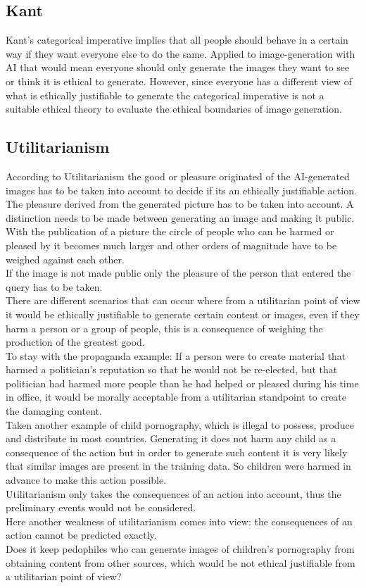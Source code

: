 \documentclass[9.5pt,twocolumn,twoside]{osajnl}
\begin{document}
\subsection{Kant}
Kant's categorical imperative implies that all people should behave in a certain way if they want everyone else to do the same.
Applied to image-generation with AI that would mean everyone should only generate the images they want to see or think it is ethical to generate.
However, since everyone has a different view of what is ethically justifiable to generate the categorical imperative is not a suitable ethical theory to evaluate the ethical boundaries of image generation.
\subsection{Utilitarianism}
According to Utilitarianism the good or pleasure originated of the AI-generated images has to be taken into account to decide if its an ethically justifiable action. \\
The pleasure derived from the generated picture has to be taken into account.
A distinction needs to be made between generating an image and making it public. With the publication of a picture the circle of people who can be harmed or pleased by it becomes much larger and other orders of magnitude have to be weighed against each other.\\
If the image is not made public only the pleasure of the person that entered the query has to be taken. \\
There are different scenarios that can occur where from a utilitarian point of view it would be ethically justifiable to generate certain content or images, even if they harm a person or a group of people, this is a consequence of weighing the production of the greatest good. \\
To stay with the propaganda example: If a person were to create material that harmed a politician's reputation so that he would not be re-elected, but that politician had harmed more people than he had helped or pleased during his time in office, it would be morally acceptable from a utilitarian standpoint to create the damaging content.\\
Taken another example of child pornography, which is illegal to possess, produce and distribute in most countries. Generating it does not harm any child as a consequence of the action but in order to generate such content it is very likely that similar images are present in the training data. So children were harmed in advance to make this action possible.\\ Utilitarianism only takes the consequences of an action into account, thus the preliminary events would not be considered. \\
Here another weakness of utilitarianism comes into view: the consequences of an action cannot be predicted exactly.\\
Does it keep pedophiles who can generate images of children's pornography from obtaining content from other sources, which would be not ethical justifiable from a utilitarian point of view?
\end{document}
